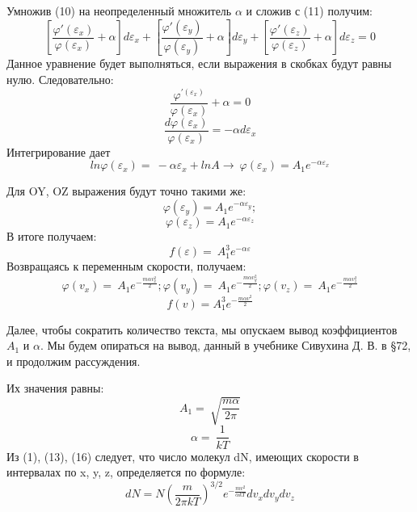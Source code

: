 \documentclass[a4paper,12pt]{article}
\begin{document}
Умножив (10) на неопределенный множитель $\alpha$ и сложив с (11) получим:
\begin{equation}
\left[\frac{\varphi\prime\left(\varepsilon_x\right)}{\varphi\left(\varepsilon_x\right)}+\alpha\right]d\varepsilon_x+\left[\frac{\varphi\prime\left(\varepsilon_y\right)}{\varphi\left(\varepsilon_y\right)}+\alpha\right]d\varepsilon_y+\left[\frac{\varphi\prime\left(\varepsilon_z\right)}{\varphi\left(\varepsilon_z\right)}+\alpha\right]d\varepsilon_z=0
\end{equation}
Данное уравнение будет выполняться, если выражения в скобках будут равны нулю. Следовательно:
$$\frac{\varphi^{\prime\left(\varepsilon_x\right)}}{\varphi\left(\varepsilon_x\right)}+\alpha=0$$
$$\frac{d\varphi\left(\varepsilon_x\right)}{\varphi\left(\varepsilon_x\right)}=-\alpha d\varepsilon_x$$
Интегрирование дает
\begin{equation}
ln\varphi\left(\varepsilon_x\right)=\ -\alpha\varepsilon_x+lnA\rightarrow\ \varphi\left(\varepsilon_x\right)=A_1e^{-\alpha\varepsilon_x}
\end{equation}

Для OY, OZ выражения будут точно такими же:
$$\varphi\left(\varepsilon_y\right)=A_1e^{-\alpha\varepsilon_y};$$ $$\varphi\left(\varepsilon_z\right)=A_1e^{-\alpha\varepsilon_z}$$
В итоге получаем:
\begin{equation}
f\left(\varepsilon\right)=\ A_1^3e^{-\alpha\varepsilon}
\end{equation}
Возвращаясь к переменным скорости, получаем:
$$
\varphi\left(v_x\right)=\ A_1e^{-\frac{m\alpha v_x^2}{2}}; \varphi\left(v_y\right)=\ A_1e^{-\frac{m\alpha v_y^2}{2}}; \varphi\left(v_z\right)=\ A_1e^{-\frac{m\alpha v_z^2}{2}}
$$
\begin{equation}
f\left(v\right)= A_1^3e^{-\frac{m\alpha v^2}{2}}
\end{equation}

Далее, чтобы сократить количество текста, мы опускаем вывод коэффициентов $A_1$ и $\alpha$. Мы будем опираться на вывод, данный в учебнике Сивухина Д. В. в §72, и продолжим рассуждения.

Их значения равны:
\begin{equation}
A_1=\ \sqrt{\frac{m\alpha}{2\pi}}
\end{equation}
\begin{equation}
\alpha=\ \frac{1}{kT}
\end{equation}
Из (1), (13), (16) следует, что число молекул dN, имеющих скорости в интервалах по x, y, z, определяется по формуле:
\begin{equation}
dN=N\left(\frac{m}{2\pi kT}\right)^{3/2}e^{-\frac{mv^2}{\alpha kT}}dv_xdv_ydv_z\end{equation}
\end{document}
